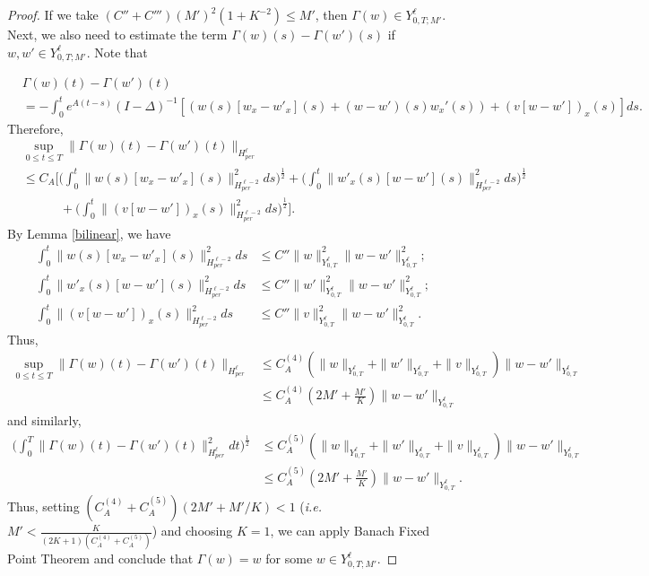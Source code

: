 \documentclass[10pt,a4paper,final]{article}
\numberwithin{equation}{section}
\newcommand{\GG}{\Gamma}
\begin{document}
\begin{proof}
If we take $(C''+C''')(M')^2(1+K^{-2})\leq M'$, then $\Gamma(w)\in Y^{\ell}_{0,T;M'}$.\\

Next, we also need to estimate the term $\Gamma(w)(s)-\Gamma(w')(s)$ if $w,w'\in Y^{\ell}_{0,T;M'}$. Note that 

\begin{align*}
    &\Gamma(w)(t)-\Gamma(w')(t)\\%
    &= -\int_0^t e^{A(t-s)}(I-\Delta)^{-1}[(w(s)[w_x-w'_x](s)+(w-w')(s)w_x'(s))+(v[w-w'])_x(s)]ds.
\end{align*}
Therefore, 
\begin{align*}
    &\sup_{0\leq t\leq T}\|\Gamma(w)(t)-\Gamma(w')(t)\|_{H^\ell_{per}}\\
    &\leq C_A\bigg[\bigg(\int_0^t\|w(s)[w_x-w'_x](s)\|^2_{H^{\ell-2}_{per}}ds\bigg)^{\frac12}+\bigg(\int_0^t\|w'_x(s)[w-w'](s)\|^2_{H^{\ell-2}_{per}}ds\bigg)^{\frac12}\\
    &\quad\quad\quad +\bigg(\int_0^t\|(v[w-w'])_x(s)\|^2_{H^{\ell-2}_{per}}ds\bigg)^{\frac12}\bigg].
\end{align*}
By Lemma \ref{bilinear}, we have 
\begin{align*}
    \int_0^t\|w(s)[w_x-w'_x](s)\|^2_{H^{\ell-2}_{per}}ds&\leq C'' \|w\|^2_{Y^{\ell}_{0,T}}\|w-w'\|^2_{Y^{\ell}_{0,T}};\\
    \int_0^t\|w'_x(s)[w-w'](s)\|^2_{H^{\ell-2}_{per}}ds&\leq C''\|w'\|^2_{Y^{\ell}_{0,T}}\|w-w'\|^2_{Y^{\ell}_{0,T}};\\
    \int_0^t\|(v[w-w'])_x(s)\|^2_{H^{\ell-2}_{per}}ds&\leq C''\|v\|_{Y^{\ell}_{0,T}}^2\|w-w'\|^2_{Y^{\ell}_{0,T}}.
\end{align*}
Thus, 
\begin{align*}
    \sup_{0\leq t\leq T}\|\Gamma(w)(t)-\Gamma(w')(t)\|_{H^{\ell}_{per}}&\leq C_A^{(4)}(\|w\|_{Y^{\ell}_{0,T}}+\|w'\|_{Y^{\ell}_{0,T}}+\|v\|_{Y^{\ell}_{0,T}})\|w-w'\|_{Y^{\ell}_{0,T}}\\
    &\leq C_A^{(4)}(2M'+\frac{M'}{K})\|w-w'\|_{Y^{\ell}_{0,T}}
\end{align*}
and similarly, 
\begin{align*}
    \bigg(\int_0^T\|\Gamma(w)(t)-\Gamma(w')(t)\|_{H^\ell_{per}}^2dt\bigg)^\frac{1}{2}&\leq C_A^{(5)}(\|w\|_{Y^{\ell}_{0,T}}+\|w'\|_{Y^{\ell}_{0,T}}+\|v\|_{Y^{\ell}_{0,T}})\|w-w'\|_{Y^{\ell}_{0,T}}\\
    &\leq C_A^{(5)} (2M'+\frac{M'}{K})\|w-w'\|_{Y^{\ell}_{0,T}}.
\end{align*}
Thus, setting $(C^{(4)}_A+C^{(5)}_A)(2M'+M'/K)<1$ (\textit{i.e.} $M'<\frac{K}{(2K+1)(C^{(4)}_A+C^{(5)}_A)}$) and choosing $K=1$, we can apply Banach Fixed Point Theorem and conclude that $\GG(w)=w$ for some $w\in Y^{\ell}_{0,T;M'}$.  
\end{proof}
\end{document}
